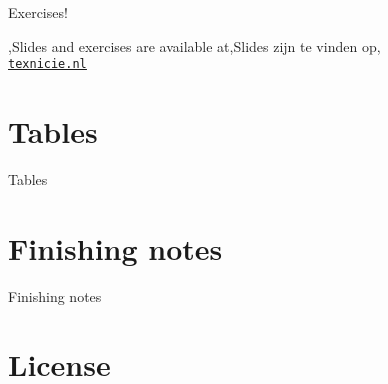\documentclass[
    english,
    everyoneauthor=true,
    defaultSlideCollection=vincent,
]{../../cursuspresentatie}
\begin{document}
\begin{frame}
    \begin{center}
        {\LARGE Exercises!}
        \vspace{30pt}

        {\Large\lang,Slides and exercises are available at,Slides zijn te vinden op,\\
         \href{https://texnicie.nl}{\ul{\texttt{texnicie.nl}}}}
    \end{center}
\end{frame}


\section{Tables}
\def\placetarget{\hypertarget{tables}{}}

\begin{frame}
    Tables
\end{frame}

\section{Finishing notes}
\def\placetarget{\hypertarget{finishingnotes}{}}

\begin{frame}
    Finishing notes
\end{frame}


\section{License}
    
\end{document}
